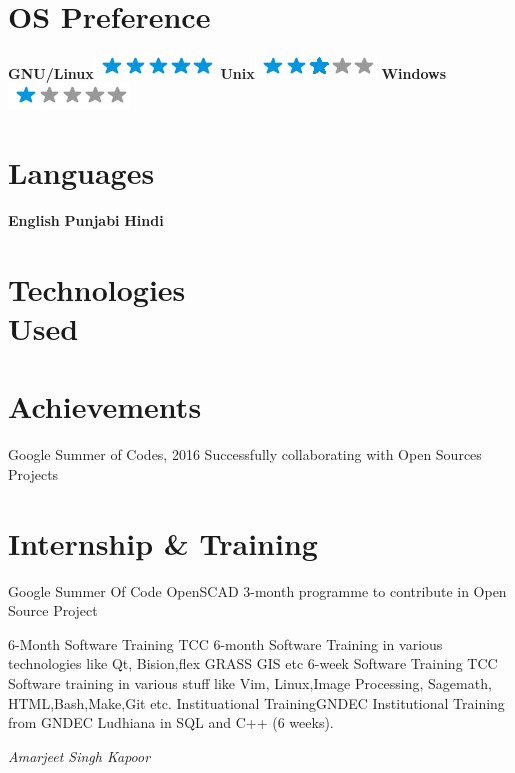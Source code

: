\documentclass[]{friggeri-cv}
\begin{document}
\\
\newpage

\begin{aside}
  \section{OS Preference}
    \textbf{GNU/Linux}\includegraphics[scale=0.40]{img/5stars.png}
    \textbf{Unix}\includegraphics[scale=0.40]{img/3stars.png}
    \textbf{Windows}\includegraphics[scale=0.40]{img/1stars.png}
    ~
  \section{Languages}
    \textbf{English}
    \textbf{Punjabi}
    \textbf{Hindi}
    ~
  \section{Technologies \\ Used}
\end{aside}

\section{Achievements}
\begin{entrylist}
  \entry{}
    {Google Summer of Codes, 2016}
    {}{}
    \entry{}
    {
        Successfully collaborating with Open Sources Projects 
    }{}{}

\end{entrylist}

\section{Internship \& Training}
    \begin{entrylist}
    \entry
    {}
    {Google Summer Of Code }  
    {OpenSCAD}
    {3-month programme to contribute in Open Source Project }
    
    \entry
    {}
    {6-Month Software Training }
    {TCC}
    {6-month Software Training in various technologies like Qt, Bision,flex GRASS GIS etc}
    \entry
    {}
    {6-week Software Training}  
    {TCC}
    {
        Software training in various stuff like Vim, Linux,Image Processing, Sagemath, HTML,Bash,Make,Git etc.
    }
    \entry
    {}
    {Instituational Training}{GNDEC} 
    {
    Institutional Training from GNDEC Ludhiana in SQL and C++ (6 weeks).}
\end{entrylist}

\begin{flushright}
\emph{Amarjeet Singh Kapoor}
\end{flushright}
\end{document}
